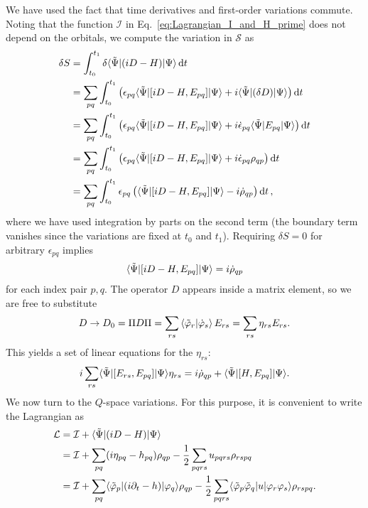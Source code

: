 \documentclass[aip,jcp,preprint,superscriptaddress,nofootinbib]{revtex4-1}
\begin{document}
We have used the fact that time derivatives and first-order variations commute.
Noting that the function $\mathcal{I}$ in Eq.~\eqref{eq:Lagrangian_I_and_H_prime} does not depend on the orbitals,
we compute the variation in $\mathcal{S}$ as
\begin{align}
    \delta{S} 
    &= \int_{t_0}^{t_1} \delta \langle \tilde{\Psi} \vert (iD - H) \vert \Psi \rangle \dd{t} \nonumber\\
    &= \sum_{pq} \int_{t_0}^{t_1} \left( \epsilon_{pq} \langle \tilde{\Psi} \vert [iD - H, E_{pq}] \vert \Psi \rangle + i \langle \tilde{\Psi} \vert (\delta D) \vert \Psi \rangle \right) \dd{t} \nonumber\\ 
    &= \sum_{pq} \int_{t_0}^{t_1} \left( \epsilon_{pq} \langle \tilde{\Psi} \vert [iD - H, E_{pq}] \vert \Psi \rangle + i \dot{\epsilon}_{pq} \langle \tilde{\Psi} \vert E_{{p} {q}} \vert \Psi \rangle \right) \dd{t} \nonumber\\ 
    &= \sum_{pq} \int_{t_0}^{t_1} \left( \epsilon_{pq} \langle \tilde{\Psi} \vert [iD - H, E_{pq}] \vert \Psi \rangle + i \dot{\epsilon}_{pq} \rho_{qp} \right) \dd{t} \nonumber\\ 
    &= \sum_{pq} \int_{t_0}^{t_1} \epsilon_{pq} \left( \langle \tilde{\Psi} \vert [iD - H, E_{pq}] \vert \Psi \rangle - i \dot{\rho}_{qp} \right) \dd{t}, 
\end{align}
where we have used integration by parts on the second term (the boundary term vanishes since the variations are fixed at $t_0$ and $t_1$).
Requiring $\delta S = 0$ for arbitrary $\epsilon_{pq}$ implies
\begin{align}
    \langle \tilde{\Psi} \vert [iD - H, E_{pq}] \vert \Psi \rangle = i \dot{\rho}_{qp}
\end{align}
for each index pair $p,q$.
The operator $D$ appears inside a matrix element, so we are free to
substitute
\begin{align}
    D \rightarrow D_0 
    = \Pi D \Pi 
    = \sum_{rs} \braket{\tilde{\varphi}_{r} | \dot{\varphi}_{s}} E_{{r} {s}}
    = \sum_{rs} \eta_{rs} E_{{r} {s}}.
\end{align}
This yields a set of linear equations for the $\eta_{rs}$:
\begin{align}
    i \sum_{rs} \langle \tilde{\Psi} \vert [E_{{r} {s}}, E_{{p} {q}}] \vert \Psi \rangle \eta_{rs} = i \dot{\rho}_{qp} + \langle \tilde{\Psi} \vert [H, E_{pq}] \vert \Psi \rangle.
\end{align}
We now turn to the $Q$-space variations. For this purpose,
it is convenient to write the Lagrangian as
\begin{align} \label{eq:Lagrangian_for_Q_space_variation}
    \mathcal{L} 
    &= \mathcal{I} + \langle \tilde{\Psi} \vert (iD - H) \vert \Psi \rangle \nonumber\\
    &= \mathcal{I} + \sum_{pq} (i \eta_{pq} - h_{pq}) \rho_{qp} - \frac{1}{2} \sum_{pqrs} u_{pqrs} \rho_{rspq} \nonumber\\
    &= \mathcal{I} +
    \sum_{pq} \langle \tilde{\varphi}_{p} \vert (i \partial_t - h) \vert \varphi_{q} \rangle \rho_{qp} 
    - \frac{1}{2} \sum_{pqrs} \langle \tilde{\varphi}_{p} \tilde{\varphi}_{q} \vert u \vert \varphi_{r} \varphi_{s} \rangle \rho_{rspq}.
\end{align}
\end{document}
